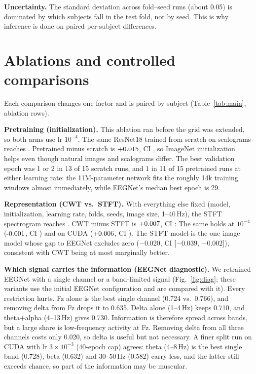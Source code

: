 \documentclass[conference]{IEEEtran}
\begin{document}
\begin{table}[t]
\centering
\caption{Permutation test on stored test predictions (2{,}000 permutations, per-subject BA). Shuffle and Shift give the mean chance level under each null; the circular-shift null preserves the temporal clustering of slow trials.}
\label{tab:perm}
\footnotesize

\end{table}

\textbf{Uncertainty.} The standard deviation across fold--seed runs (about 0.05) is dominated by which subjects fall in the test fold, not by seed. This is why inference is done on paired per-subject differences.

\section{Ablations and controlled comparisons}
Each comparison changes one factor and is paired by subject (Table~\ref{tab:main}, ablation rows).

\textbf{Pretraining (initialization).} This ablation ran before the grid was extended, so both arms use lr $10^{-4}$. The same ResNet18 trained from scratch on scalograms reaches \scratchSubj{}. Pretrained minus scratch is $+0.015$, CI \ciScratch{}, so ImageNet initialization helps even though natural images and scalograms differ. The best validation epoch was 1 or 2 in 13 of 15 scratch runs, and 1 in 11 of 15 pretrained runs at either learning rate: the 11M-parameter network fits the roughly 14k training windows almost immediately, while EEGNet's median best epoch is 29.

\textbf{Representation (CWT vs.\ STFT).} With everything else fixed (model, initialization, learning rate, folds, seeds, image size, 1--40\,Hz), the STFT spectrogram reaches \stftSubj{}. CWT minus STFT is $+0.007$, CI \ciStft{}: \stftSentence{} The same holds at $10^{-4}$ ($\deltaStftOld$, CI \ciStftOld) and on CUDA ($+0.006$, CI \ciStftCuda). The STFT model is the one image model whose gap to EEGNet excludes zero ($-0.020$, CI [$-0.039$, $-0.002$]), consistent with CWT being at most marginally better.

\textbf{Which signal carries the information (EEGNet diagnostic).} We retrained EEGNet with a single channel or a band-limited signal (Fig.~\ref{fig:diag}; these variants use the initial EEGNet configuration and are compared with it). Every restriction hurts. Fz alone is the best single channel (0.724 vs.\ 0.766), and removing delta from Fz drops it to 0.635. Delta alone (1--4\,Hz) keeps 0.710, and theta+alpha (4--13\,Hz) gives 0.730. Information is therefore spread across bands, but a large share is low-frequency activity at Fz. Removing delta from all three channels costs only 0.020, so delta is useful but not necessary. A finer split run on CUDA with lr $3\!\times\!10^{-3}$ (40-epoch cap) agrees: theta (4--8\,Hz) is the best single band (0.728), beta (0.632) and 30--50\,Hz (0.582) carry less, and the latter still exceeds chance, so part of the information may be muscular.
\end{document}
